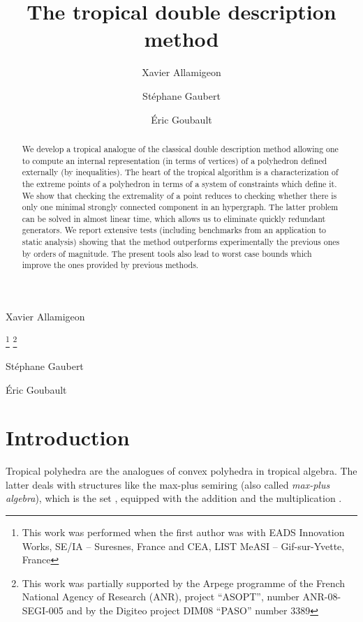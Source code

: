 \documentclass[proceedings]{stacs}
\begin{document}
\title{The tropical double description method}
\author[ref1]{Xavier {A}llamigeon}{Xavier {A}llamigeon}
\address[ref1]{Direction du Budget, 4\`eme sous-direction, Bureau des transports, Paris, France}
\thanks{This work was performed when the first author was with EADS Innovation Works, SE/IA -- Suresnes, France and CEA, LIST MeASI -- Gif-sur-Yvette, France}
\thanks{This work was partially supported by the Arpege programme of the French National Agency of Research (ANR), project ``ASOPT'', number ANR-08-SEGI-005 and
by the Digiteo project DIM08 ``PASO'' number 3389}
\author[ref2]{{S}t{\'e}phane {G}aubert}{{S}t{\'e}phane {G}aubert}
\address[ref2]{INRIA Saclay and CMAP, Ecole Polytechnique, France}
\author[ref3]{{\'E}ric {G}oubault}{{\'E}ric {G}oubault}
\address[ref3]{CEA, LIST MeASI -- Gif-sur-Yvette, France}
\begin{abstract}
We develop a tropical analogue of the classical double description
method allowing one to compute an internal
representation (in terms of vertices) of a polyhedron defined
externally (by inequalities).  The heart of the tropical algorithm is
a characterization of the extreme points of a polyhedron in terms of a
system of constraints which define it. We show that checking the
extremality of a point reduces to checking whether there is only one
minimal strongly connected component in an hypergraph. The latter
problem can be solved in almost linear time, which allows us to
eliminate quickly redundant generators. We report extensive tests
(including benchmarks from an application to static analysis) showing
that the method outperforms experimentally the previous ones by orders
of magnitude. The present tools also lead to worst case bounds which
improve the ones provided by previous methods.
\end{abstract}

\maketitle

\section*{Introduction}\label{sec:intro}
Tropical polyhedra are the analogues of convex polyhedra in tropical algebra. The latter deals with structures like the max-plus semiring  (also called \emph{max-plus algebra}), which is the set , equipped with the addition  and the multiplication . 
\end{document}
